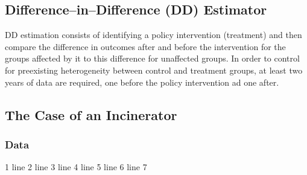 \documentclass[landscape,letterpaper,9pt]{article}
\begin{document}
\newpage
\subsection{Difference--in--Difference (DD) Estimator}
DD estimation consists of identifying a policy intervention (treatment) and then compare the difference
in outcomes after and before the intervention for the groups affected by it to this difference for
unaffected groups. In order to control for preexisting heterogeneity between control and treatment groups,
at least two years of data are required, one before the policy intervention ad one after.

\newpage
\subsection{The Case of an Incinerator}

%
% 

\subsubsection{Data}
\begin{CVerbatim}
 1
line 2
line 3
line 4
line 5
line 6
line 7
\end{CVerbatim}
\end{document}
